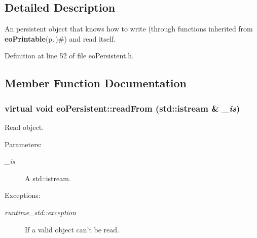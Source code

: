\subsection{Detailed Description}
An persistent object that knows how to write (through functions inherited from {\bf eo\-Printable}{\rm (p.\,\pageref{classeo_printable})}\#) and read itself. 



Definition at line 52 of file eo\-Persistent.h.

\subsection{Member Function Documentation}
\subsubsection{\setlength{\rightskip}{0pt plus 5cm}virtual void eo\-Persistent::read\-From (std::istream \& {\em \_\-is})\hspace{0.3cm}{\tt  [pure virtual]}}\label{classeo_persistent_a1}


Read object. 

\begin{Desc}
\item[Parameters:]
\begin{description}
\item[{\em \_\-is}]A std::istream. \end{description}
\end{Desc}
\begin{Desc}
\item[Exceptions:]
\begin{description}
\item[{\em runtime\_\-std::exception}]If a valid object can't be read. \end{description}
\end{Desc}


